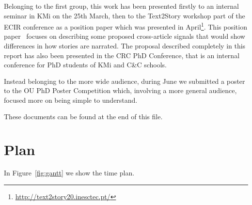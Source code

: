 Belonging to the first group, this work has been presented firstly to an internal seminar in KMi on the 25th March, then to the Text2Story workshop part of the ECIR conference as a position paper which was presented in April\footnote{\url{http://text2story20.inesctec.pt/}}.
This position paper~\cite{mensio2020towards} focuses on describing some proposed cross-article signals that would show differences in how stories are narrated.
The proposal described completely in this report has also been presented in the CRC PhD Conference, that is an internal conference for PhD students of KMi and C\&C schools.

Instead belonging to the more wide audience, during June we submitted a poster to the OU PhD Poster Competition which, involving a more general audience, focused more on being simple to understand.

These documents can be found at the end of this file.






\section{Plan}


In Figure~\ref{fig:gantt} we show the time plan.

